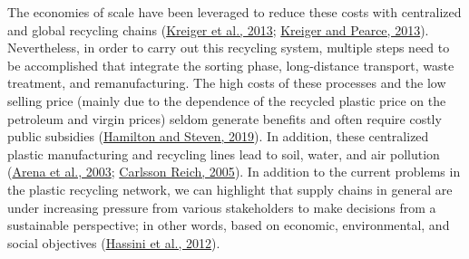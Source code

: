 \documentclass[12pt]{elsarticle} %
\begin{document}
The economies of scale have been leveraged to reduce these costs with centralized and global recycling chains (\protect\hyperlink{ref-Anzalone2013}{Kreiger et al., 2013}; \protect\hyperlink{ref-Kreiger2013}{Kreiger and Pearce, 2013}).
Nevertheless, in order to carry out this recycling system, multiple steps need to be accomplished that integrate the sorting phase, long-distance transport, waste treatment, and remanufacturing. The high costs of these processes and the low selling price (mainly due to the dependence of the recycled plastic price on the petroleum and virgin prices) seldom generate benefits and often require costly public subsidies (\protect\hyperlink{ref-hamilton2019}{Hamilton and Steven, 2019}).
In addition, these centralized plastic manufacturing and recycling lines lead to soil, water, and air pollution (\protect\hyperlink{ref-Arena2003}{Arena et al., 2003}; \protect\hyperlink{ref-carlssonreich2005}{Carlsson Reich, 2005}).
In addition to the current problems in the plastic recycling network, we can highlight that supply chains in general are under increasing pressure from various stakeholders to make decisions from a sustainable perspective; in other words, based on economic, environmental, and social objectives (\protect\hyperlink{ref-hassini2012}{Hassini et al., 2012}).
\end{document}
